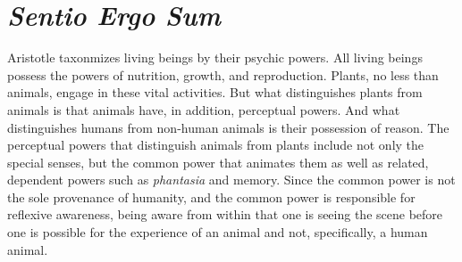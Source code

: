 





\section{\emph{Sentio Ergo Sum}} %
\label{sec:sensato_ergo_sum}

Aristotle taxonmizes living beings by their psychic powers. All living beings possess the powers of nutrition, growth, and reproduction. Plants, no less than animals, engage in these vital activities. But what distinguishes plants from animals is that animals have, in addition, perceptual powers. And what distinguishes humans from non-human animals is their possession of reason. The perceptual powers that distinguish animals from plants include not only the special senses, but the common power that animates them as well as related, dependent powers such as \emph{phantasia} and memory. Since the common power is not the sole provenance of humanity, and the common power is responsible for reflexive awareness, being aware from within that one is seeing the scene before one is possible for the experience of an animal and not, specifically, a human animal.

